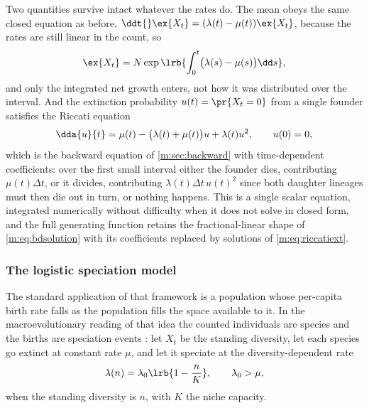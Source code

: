 Two quantities survive intact whatever the rates do. The mean obeys the same
closed equation as before, $\ddt{}\ex{X_t}=(\lambda(t)-\mu(t))\ex{X_t}$, because
the rates are still linear in the count, so
\begin{equation}
\label{m:eq:meanodeinhom}
\ex{X_t} = N\exp\lrb{\int_0^t\bigl(\lambda(s)-\mu(s)\bigr)\dd s} ,
\end{equation}
and only the integrated net growth enters, not how it was distributed over the
interval. And the extinction probability $u(t)=\pr{X_t=0}$ from a single founder
satisfies the Riccati equation
\begin{equation}
\label{m:eq:riccatiext}
\dda{u}{t} = \mu(t)-\bigl(\lambda(t)+\mu(t)\bigr)u+\lambda(t)u^2,
\qquad u(0)=0 ,
\end{equation}
which is the backward equation of \cref{m:sec:backward} with time-dependent
coefficients: over the first small interval either the founder dies, contributing
$\mu(t)\Delta t$, or it divides, contributing $\lambda(t)\Delta t\,u(t)^2$ since
both daughter lineages must then die out in turn, or nothing happens. This is a
single scalar equation, integrated numerically without difficulty when it does
not solve in closed form, and the full generating function retains the
fractional-linear shape of \cref{m:eq:bdsolution} with its coefficients replaced
by solutions of \cref{m:eq:riccatiext}.

\subsubsection{The logistic speciation model}
\label{m:sec:logisticspeciation}

The standard application of that framework is a population whose per-capita birth
rate falls as the population fills the space available to it. In the macroevolutionary
reading of that idea the counted individuals are species and the births are
speciation events \cite{Allen2010}: let $X_t$ be the standing diversity, let each
species go extinct at constant rate $\mu$, and let it speciate at the
diversity-dependent rate
\begin{equation}
\label{m:eq:speciationrate}
\lambda(n) = \lambda_0\lrb{1-\frac{n}{K}},
\qquad \lambda_0>\mu ,
\end{equation}
when the standing diversity is $n$, with $K$ the niche capacity.

